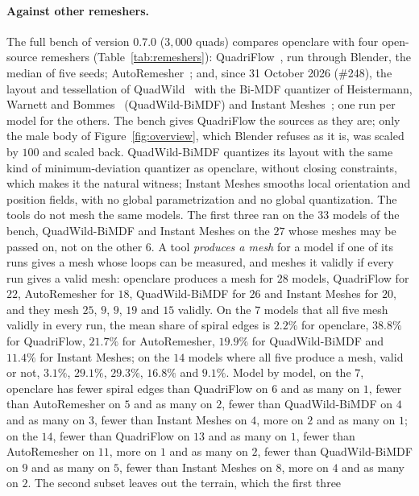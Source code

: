 \documentclass[11pt,a4paper]{article}
\begin{document}
\paragraph{Against other remeshers.}
The full bench of version 0.7.0 ($3{,}000$ quads) compares openclare with
four open-source remeshers (Table~\ref{tab:remeshers}):
QuadriFlow~\cite{huang2018quadriflow}, run through Blender, the median of
five seeds; AutoRemesher~\cite{autoremesher}; and, since 31 October 2026
(\#248), the layout and tessellation of QuadWild~\cite{pietroni2021reliable}
with the Bi-MDF quantizer of Heistermann, Warnett and
Bommes~\cite{heistermann2023bimdf} (QuadWild-BiMDF) and Instant
Meshes~\cite{jakob2015instant}; one run per model for the others. The bench
gives QuadriFlow the sources as they are; only the male body of
Figure~\ref{fig:overview}, which Blender refuses as it is, was scaled by $100$
and scaled back. QuadWild-BiMDF
quantizes its layout with the same kind of minimum-deviation quantizer as
openclare, without closing constraints, which makes it the natural witness;
Instant Meshes smooths local orientation and position fields, with no global
parametrization and no global quantization. The tools do not mesh the same models. The
first three ran on the $33$ models of the bench, QuadWild-BiMDF and Instant
Meshes on the $27$ whose meshes may be passed on, not on the other $6$. A
tool \emph{produces a mesh} for a model if one of its runs gives a mesh whose
loops can be measured, and meshes it validly if every run gives a valid mesh:
openclare produces a mesh for $28$ models, QuadriFlow for $22$, AutoRemesher
for $18$, QuadWild-BiMDF for $26$ and Instant Meshes for $20$, and they mesh
$25$, $9$, $9$, $19$ and $15$ validly. On the $7$ models that all five mesh
validly in every run, the mean share of spiral edges is $2.2\%$ for
openclare, $38.8\%$ for QuadriFlow, $21.7\%$ for AutoRemesher, $19.9\%$ for
QuadWild-BiMDF and $11.4\%$ for Instant Meshes; on the $14$ models where all
five produce a mesh, valid or not, $3.1\%$, $29.1\%$, $29.3\%$, $16.8\%$ and
$9.1\%$. Model by model, on the $7$, openclare has fewer spiral edges than
QuadriFlow on $6$ and as many on $1$, fewer than AutoRemesher on $5$ and as
many on $2$, fewer than QuadWild-BiMDF on $4$ and as many on $3$, fewer than
Instant Meshes on $4$, more on $2$ and as many on $1$; on the $14$, fewer
than QuadriFlow on $13$ and as many on $1$, fewer than AutoRemesher on $11$,
more on $1$ and as many on $2$, fewer than QuadWild-BiMDF on $9$ and as many
on $5$, fewer than Instant Meshes on $8$, more on $4$ and as many on $2$. The second subset leaves out the terrain, which the first three
\end{document}
